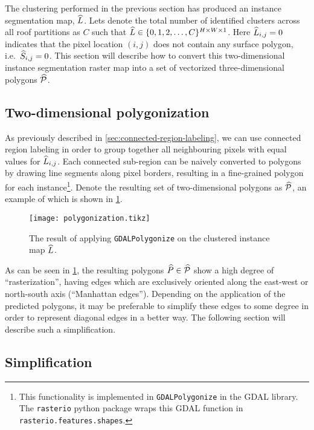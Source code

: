 The clustering performed in the previous section has produced an instance segmentation map, $\widehat{L}$.
Lets denote the total number of identified clusters across all roof partitions as $C$ such that $\widehat{L} \in \{0, 1, 2, \ldots, C\}^{H \times W \times 1}$.
Here $\widehat{L}_{i,j} = 0$ indicates that the pixel location $(i,j)$ does not contain any surface polygon, i.e.\ $\widehat{S}_{i,j} = 0$.
This section will describe how to convert this two-dimensional instance segmentation raster map into a set of vectorized three-dimensional polygons $\widehat{\mathcal{P}}$.

\subsection{Two-dimensional polygonization}

As previously described in \cref{sec:connected-region-labeling}, we can use connected region labeling in order to group together all neighbouring pixels with equal values for $\widehat{L}_{i,j}$.
Each connected sub-region can be naively converted to polygons by drawing line segments along pixel borders, resulting in a fine-grained polygon for each instance\footnote{This functionality is implemented in \texttt{GDALPolygonize} in the GDAL library. The \texttt{rasterio} python package wraps this GDAL function in \texttt{rasterio.features.shapes}.}.
Denote the resulting set of two-dimensional polygons as $\widehat{\mathcal{P}}$, an example of which is shown in \cref{fig:polygonization}.
\begin{figure}[H]
  \centering
  \texttt{[image: polygonization.tikz]}
  \caption{The result of applying \texttt{GDALPolygonize} on the clustered instance map $\widehat{L}$.}%
  \label{fig:polygonization}
\end{figure}
\noindent
As can be seen in \cref{fig:polygonization}, the resulting polygons $\widehat{P} \in \widehat{\mathcal{P}}$ show a high degree of \enquote{rasterization}, having edges which are exclusively oriented along the east-west or north-south axis (\enquote{Manhattan edges}).
Depending on the application of the predicted polygons, it may be preferable to simplify these edges to some degree in order to represent diagonal edges in a better way.
The following section will describe such a simplification.
\newpage

\subsection{Simplification}%
\label{sec:simplification}

